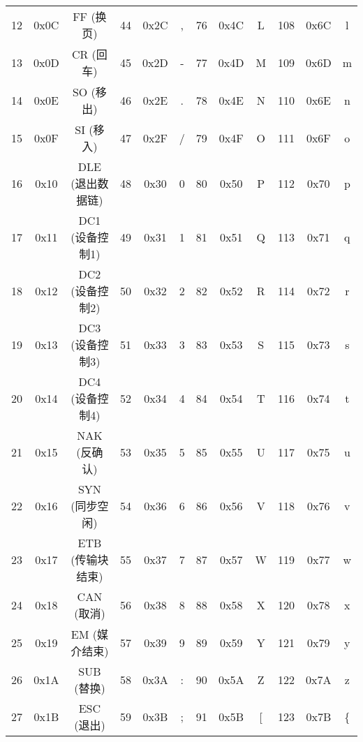 \documentclass[a4paper, twoside]{article}
\begin{document}
\begin{table}[h]
\begin{tabular}{|c c c|c c c|c c c|c c c|}
        12  & 0x0C & FF (换页)         & 44  & 0x2C & ,          & 76  & 0x4C & L           & 108  & 0x6C & l            \\
        13  & 0x0D & CR (回车)         & 45  & 0x2D & -          & 77  & 0x4D & M           & 109  & 0x6D & m            \\
        14  & 0x0E & SO (移出)         & 46  & 0x2E & .          & 78  & 0x4E & N           & 110  & 0x6E & n            \\
        15  & 0x0F & SI (移入)         & 47  & 0x2F & /          & 79  & 0x4F & O           & 111  & 0x6F & o            \\
        16  & 0x10 & DLE (退出数据链)  & 48  & 0x30 & 0          & 80  & 0x50 & P           & 112  & 0x70 & p            \\
        17  & 0x11 & DC1 (设备控制1)   & 49  & 0x31 & 1          & 81  & 0x51 & Q           & 113  & 0x71 & q            \\
        18  & 0x12 & DC2 (设备控制2)   & 50  & 0x32 & 2          & 82  & 0x52 & R           & 114  & 0x72 & r            \\
        19  & 0x13 & DC3 (设备控制3)   & 51  & 0x33 & 3          & 83  & 0x53 & S           & 115  & 0x73 & s            \\
        20  & 0x14 & DC4 (设备控制4)   & 52  & 0x34 & 4          & 84  & 0x54 & T           & 116  & 0x74 & t            \\
        21  & 0x15 & NAK (反确认)      & 53  & 0x35 & 5          & 85  & 0x55 & U           & 117  & 0x75 & u            \\
        22  & 0x16 & SYN (同步空闲)    & 54  & 0x36 & 6          & 86  & 0x56 & V           & 118  & 0x76 & v            \\
        23  & 0x17 & ETB (传输块结束)  & 55  & 0x37 & 7          & 87  & 0x57 & W           & 119  & 0x77 & w            \\
        24  & 0x18 & CAN (取消)        & 56  & 0x38 & 8          & 88  & 0x58 & X           & 120  & 0x78 & x            \\
        25  & 0x19 & EM (媒介结束)     & 57  & 0x39 & 9          & 89  & 0x59 & Y           & 121  & 0x79 & y            \\
        26  & 0x1A & SUB (替换)        & 58  & 0x3A & :          & 90  & 0x5A & Z           & 122  & 0x7A & z            \\
        27  & 0x1B & ESC (退出)        & 59  & 0x3B & ;          & 91  & 0x5B & [           & 123  & 0x7B & \{           \\

\end{tabular}
\end{table}
\end{document}
